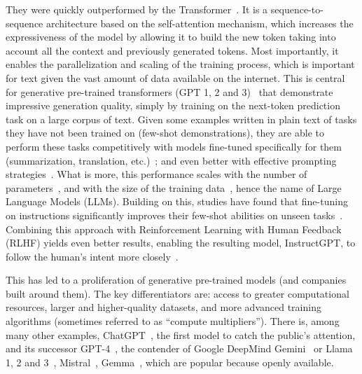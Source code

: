 They were quickly outperformed by the Transformer~\citep{vaswani2017attention}.
It is a sequence-to-sequence architecture based on the self-attention mechanism, which increases the expressiveness of the model by allowing it to build the new token taking into account all the context and previously generated tokens.
Most importantly, it enables the parallelization and scaling of the training process, which is important for text given the vast amount of data available on the internet.
This is central for generative pre-trained transformers (GPT 1, 2 and 3)~\citep{Radford2018ImprovingLU, radford2019language,brown2020language} that demonstrate impressive generation quality, simply by training on the next-token prediction task on a large corpus of text.
Given some examples written in plain text of tasks they have not been trained on (few-shot demonstrations), they are able to perform these tasks competitively with models fine-tuned specifically for them (summarization, translation, etc.)~\citep{brown2020language, rae2021scaling, chowdhery2023palm}; and even better with effective prompting strategies~\citep{wei2022chain}.
What is more, this performance scales with the number of parameters~\citep{kaplan2020scaling}, and with the size of the training data~\citep{hoffmann2022training}, hence the name of Large Language Models (\Glspl*{LLM}).
Building on this, studies have found that fine-tuning on instructions significantly improves their few-shot abilities on unseen tasks~\citep{wei2021finetuned}. 
Combining this approach with Reinforcement Learning with Human Feedback (RLHF) yields even better results, enabling the resulting model, InstructGPT, to follow the human's intent more closely~\citep{ouyang2022training}.

This has led to a proliferation of generative pre-trained models (and companies built around them).
The key differentiators are: access to greater computational resources, larger and higher-quality datasets, and more advanced training algorithms (sometimes referred to as ``compute multipliers'').
There is, among many other examples, ChatGPT~\citep{openai2024chatgpt}, the first model to catch the public's attention, and its successor GPT-4~\citep{openai2023gpt}, the contender of Google DeepMind Gemini~\citep{team2023gemini} or Llama 1, 2 and 3~\citep{touvron2023llama,touvron2023llama2,dubey2024llama}, Mistral~\citep{jiang2023mistral7b}, Gemma~\citep{team2024gemma}, which are popular because openly available.

